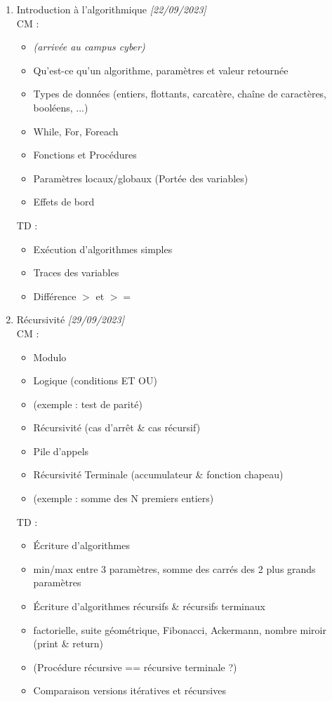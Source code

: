 \documentclass[11pt,a4paper]{article}
\begin{document}
\begin{enumerate}
\item Introduction à l'algorithmique \textit{[22/09/2023]}\\
  CM :
  \begin{itemize}
  \item \textit{(arrivée au campus cyber)}
  \item Qu'est-ce qu'un algorithme, paramètres et valeur retournée
  \item Types de données (entiers, flottants, carcatère, chaîne de caractères, booléens, ...)
  \item While, For, Foreach
  \item Fonctions et Procédures
  \item Paramètres locaux/globaux (Portée des variables)
  \item Effets de bord
  \end{itemize}
  TD :
  \begin{itemize}
  \item Exécution d'algorithmes simples
  \item Traces des variables
  \item Différence $ > $ et $ >= $
  \end{itemize}

\medskip

\item Récursivité \textit{[29/09/2023]}\\
  CM :
  \begin{itemize}
  \item Modulo
  \item Logique (conditions ET OU)
  \item (exemple : test de parité)
  \item Récursivité (cas d'arrêt \& cas récursif)
  \item Pile d'appels
  \item Récursivité Terminale (accumulateur \& fonction chapeau)
  \item (exemple : somme des N premiers entiers)
  \end{itemize}
  TD :
  \begin{itemize}
  \item \'Ecriture d'algorithmes
  \item min/max entre 3 paramètres, somme des carrés des 2 plus grands paramètres
  \item \'Ecriture d'algorithmes récursifs \& récursifs terminaux
  \item factorielle, suite géométrique, Fibonacci, Ackermann, nombre miroir (print \& return)
  \item (Procédure récursive == récursive terminale ?)
  \item Comparaison versions itératives et récursives
  \end{itemize}


\end{enumerate}
\end{document}
